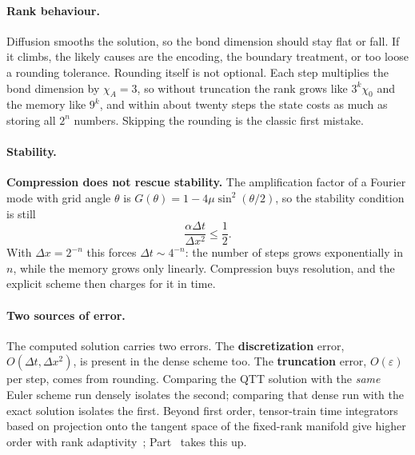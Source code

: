 \paragraph{Rank behaviour.}
Diffusion smooths the solution, so the bond dimension should stay flat or fall.
If it climbs, the likely causes are the encoding, the boundary treatment, or too
loose a rounding tolerance. Rounding itself is not optional. Each step
multiplies the bond dimension by $\chi_A = 3$, so without truncation the rank
grows like $3^k\chi_0$ and the memory like $9^k$, and within about twenty steps
the state costs as much as storing all $2^n$ numbers. Skipping the rounding is
the classic first mistake.

\paragraph{Stability.}
\textbf{Compression does not rescue stability.} The amplification factor of a
Fourier mode with grid angle $\theta$ is $G(\theta) = 1 - 4\mu\sin^2(\theta/2)$,
so the stability condition is still
\begin{equation}
  \frac{\alpha \Delta t}{\Delta x^2} \le \frac12 .
  \label{eq:heat-cfl}
\end{equation}%
With $\Delta x = 2^{-n}$ this forces $\Delta t \sim 4^{-n}$: the number of steps
grows exponentially in $n$, while the memory grows only linearly. Compression
buys resolution, and the explicit scheme then charges for it in time.

\paragraph{Two sources of error.}
The computed solution carries two errors. The \textbf{discretization} error,
$O(\Delta t, \Delta x^2)$, is present in the dense scheme too. The
\textbf{truncation} error, $O(\varepsilon)$ per step, comes from rounding.
Comparing the QTT solution with the \emph{same} Euler scheme run densely
isolates the second; comparing that dense run with the exact solution isolates
the first. Beyond first order, tensor-train time integrators based on
projection onto the tangent space of the fixed-rank manifold give higher order
with rank adaptivity~\cite{Lubich2015}; Part~ takes this up.

